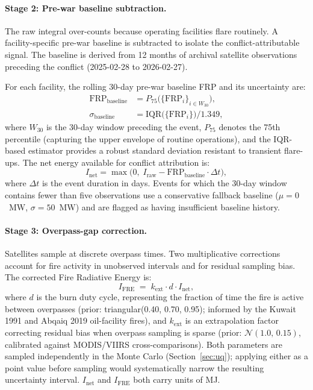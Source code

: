 \documentclass[11pt]{article}
\begin{document}
\paragraph{Stage 2: Pre-war baseline subtraction.}
The raw integral over-counts because operating facilities flare routinely.
A facility-specific pre-war baseline is subtracted to isolate the
conflict-attributable signal. The baseline is derived from 12 months of
archival satellite observations preceding the conflict
(2025-02-28 to 2026-02-27).

For each facility, the rolling 30-day pre-war baseline FRP and its
uncertainty are:
\begin{align}
\mathrm{FRP}_{\mathrm{baseline}} &=
  P_{75}\!\bigl(\{\mathrm{FRP}_i\}_{i \in W_{30}}\bigr),
\label{eq:baseline} \\
\sigma_{\mathrm{baseline}} &=
  \mathrm{IQR}\!\bigl(\{\mathrm{FRP}_i\}\bigr) \big/ 1.349,
\label{eq:baseline-std}
\end{align}
where $W_{30}$ is the 30-day window preceding the event, $P_{75}$ denotes
the 75th percentile (capturing the upper envelope of routine operations),
and the IQR-based estimator provides a robust standard deviation resistant
to transient flare-ups. The net energy available for conflict attribution
is:
\begin{equation}
I_{\mathrm{net}} = \max\!\bigl(0,\;
  I_{\mathrm{raw}} - \mathrm{FRP}_{\mathrm{baseline}} \cdot \Delta t\bigr),
\label{eq:net-frp}
\end{equation}
where $\Delta t$ is the event duration in days. Events for which the
30-day window contains fewer than five observations use a conservative
fallback baseline ($\mu = 0$~MW, $\sigma = 50$~MW) and are flagged as
having insufficient baseline history.

\paragraph{Stage 3: Overpass-gap correction.}
Satellites sample at discrete overpass times. Two multiplicative corrections
account for fire activity in unobserved intervals and for residual sampling
bias. The corrected Fire Radiative Energy is:
\begin{equation}
I_{\mathrm{FRE}} \;=\; k_{\mathrm{ext}} \cdot d \cdot I_{\mathrm{net}},
\label{eq:fre}
\end{equation}
where $d$ is the burn duty cycle, representing the fraction of time the
fire is active between overpasses (prior: triangular(0.40, 0.70, 0.95);
informed by the Kuwait 1991 and Abqaiq 2019 oil-facility fires), and
$k_{\mathrm{ext}}$ is an extrapolation factor correcting residual bias
when overpass sampling is sparse (prior: $\mathcal{N}(1.0,\,0.15)$,
calibrated against MODIS/VIIRS cross-comparisons). Both parameters are
sampled independently in the Monte Carlo (Section~\ref{sec:uq}); applying
either as a point value before sampling would systematically narrow the
resulting uncertainty interval. $I_{\mathrm{net}}$ and $I_{\mathrm{FRE}}$
both carry units of MJ.
\end{document}
